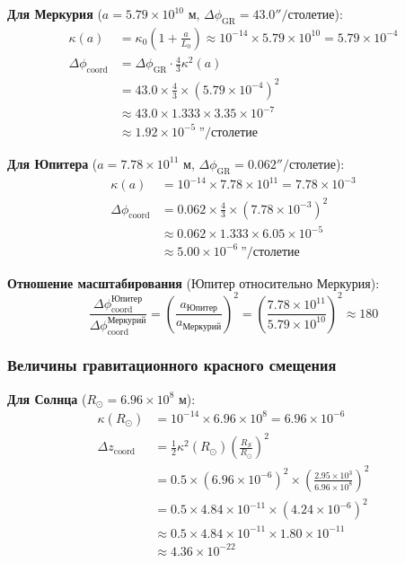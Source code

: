 \documentclass[11pt,a4paper]{article}
\begin{document}
	\textbf{Для Меркурия} ($a = 5.79 \times 10^{10}$ м, $\Delta\phi_{\text{GR}} = 43.0''/$столетие):
	\begin{align}
		\kappa(a) &= \kappa_0 \left(1 + \frac{a}{L_0}\right) 
		\approx 10^{-14} \times 5.79 \times 10^{10} = 5.79 \times 10^{-4} \\
		\Delta\phi_{\text{coord}} &= \Delta\phi_{\text{GR}} \cdot \frac{4}{3} \kappa^2(a) \\
		&= 43.0 \times \frac{4}{3} \times (5.79 \times 10^{-4})^2 \\
		&\approx 43.0 \times 1.333 \times 3.35 \times 10^{-7} \\
		&\approx 1.92 \times 10^{-5} \ \text{''}/\text{столетие}
	\end{align}
	
	\textbf{Для Юпитера} ($a = 7.78 \times 10^{11}$ м, $\Delta\phi_{\text{GR}} = 0.062''/$столетие):
	\begin{align}
		\kappa(a) &= 10^{-14} \times 7.78 \times 10^{11} = 7.78 \times 10^{-3} \\
		\Delta\phi_{\text{coord}} &= 0.062 \times \frac{4}{3} \times (7.78 \times 10^{-3})^2 \\
		&\approx 0.062 \times 1.333 \times 6.05 \times 10^{-5} \\
		&\approx 5.00 \times 10^{-6}~\text{''}/\text{столетие}
	\end{align}
	
	\textbf{Отношение масштабирования} (Юпитер относительно Меркурия):
	\begin{equation}
		\frac{\Delta\phi_{\text{coord}}^{\text{Юпитер}}}{\Delta\phi_{\text{coord}}^{\text{Меркурий}}}
		= \left(\frac{a_{\text{Юпитер}}}{a_{\text{Меркурий}}}\right)^2 
		= \left(\frac{7.78 \times 10^{11}}{5.79 \times 10^{10}}\right)^2 \approx 180
	\end{equation}
	
	\subsubsection{Величины гравитационного красного смещения}
	
	\textbf{Для Солнца} ($R_\odot = 6.96 \times 10^8$ м):
	\begin{align}
		\kappa(R_\odot) &= 10^{-14} \times 6.96 \times 10^8 = 6.96 \times 10^{-6} \\
		\Delta z_{\text{coord}} &= \frac{1}{2} \kappa^2(R_\odot) \left(\frac{R_S}{R_\odot}\right)^2 \\
		&= 0.5 \times (6.96 \times 10^{-6})^2 \times \left(\frac{2.95 \times 10^3}{6.96 \times 10^8}\right)^2 \\
		&= 0.5 \times 4.84 \times 10^{-11} \times (4.24 \times 10^{-6})^2 \\
		&\approx 0.5 \times 4.84 \times 10^{-11} \times 1.80 \times 10^{-11} \\
		&\approx 4.36 \times 10^{-22}
	\end{align}
	
\end{document}

